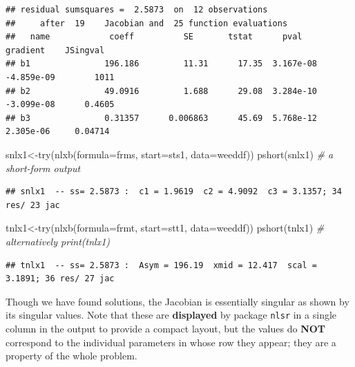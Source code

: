 \documentclass[
]{article}
\newenvironment{Shaded}{\begin{snugshade}}{\end{snugshade}}
\newcommand{\AttributeTok}[1]{\textcolor[rgb]{0.77,0.63,0.00}{#1}}
\newcommand{\CommentTok}[1]{\textcolor[rgb]{0.56,0.35,0.01}{\textit{#1}}}
\newcommand{\FunctionTok}[1]{\textcolor[rgb]{0.00,0.00,0.00}{#1}}
\newcommand{\NormalTok}[1]{#1}
\newcommand{\OtherTok}[1]{\textcolor[rgb]{0.56,0.35,0.01}{#1}}
\begin{document}
\begin{verbatim}
## residual sumsquares =  2.5873  on  12 observations
##     after  19    Jacobian and  25 function evaluations
##   name            coeff          SE       tstat      pval      gradient    JSingval   
## b1               196.186         11.31      17.35  3.167e-08  -4.859e-09        1011  
## b2               49.0916         1.688      29.08  3.284e-10  -3.099e-08      0.4605  
## b3               0.31357      0.006863      45.69  5.768e-12   2.305e-06     0.04714
\end{verbatim}

\begin{Shaded}
\begin{Highlighting}[]
\NormalTok{snlx1}\OtherTok{\textless{}{-}}\FunctionTok{try}\NormalTok{(}\FunctionTok{nlxb}\NormalTok{(}\AttributeTok{formula=}\NormalTok{frms, }\AttributeTok{start=}\NormalTok{sts1, }\AttributeTok{data=}\NormalTok{weeddf))}
\FunctionTok{pshort}\NormalTok{(snlx1) }\CommentTok{\# a short{-}form output}
\end{Highlighting}
\end{Shaded}

\begin{verbatim}
## snlx1  -- ss= 2.5873 :  c1 = 1.9619  c2 = 4.9092  c3 = 3.1357; 34 res/ 23 jac
\end{verbatim}

\begin{Shaded}
\begin{Highlighting}[]
\NormalTok{tnlx1}\OtherTok{\textless{}{-}}\FunctionTok{try}\NormalTok{(}\FunctionTok{nlxb}\NormalTok{(}\AttributeTok{formula=}\NormalTok{frmt, }\AttributeTok{start=}\NormalTok{stt1, }\AttributeTok{data=}\NormalTok{weeddf))}
\FunctionTok{pshort}\NormalTok{(tnlx1) }\CommentTok{\# alternatively print(tnlx1)}
\end{Highlighting}
\end{Shaded}

\begin{verbatim}
## tnlx1  -- ss= 2.5873 :  Asym = 196.19  xmid = 12.417  scal = 3.1891; 36 res/ 27 jac
\end{verbatim}

Though we have found solutions, the Jacobian is essentially singular as
shown by its singular values. Note that these are \textbf{displayed} by
package \texttt{nlsr} in a single column in the output to provide a
compact layout, but the values do \textbf{NOT} correspond to the
individual parameters in whose row they appear; they are a property of
the whole problem.
\end{document}
